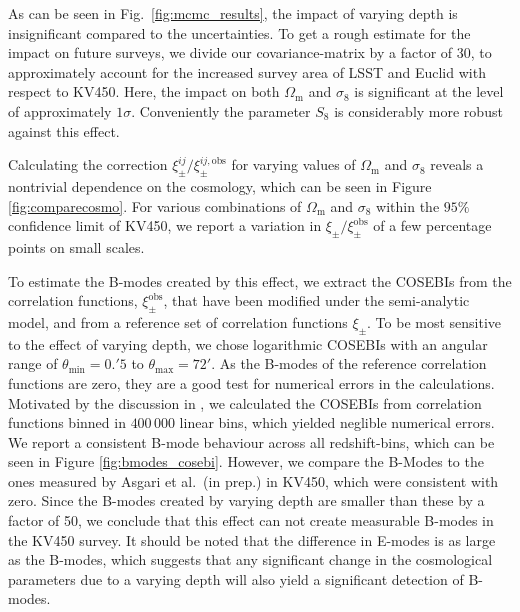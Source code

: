 \documentclass{aa}
\renewcommand{\rm}{\mathrm}
\begin{document}
As can be seen in Fig.~\ref{fig:mcmc_results}, the impact of varying depth is insignificant compared to the uncertainties. To get a rough estimate for the impact on future surveys, we divide our covariance-matrix by a factor of 30, to approximately account for the increased survey area of LSST and Euclid with respect to KV450. Here, the impact on both $\Omega_{\rm m}$ and $\sigma_8$ is significant at the level of approximately $1\sigma$. Conveniently the parameter $S_8$ is considerably more robust against this effect.

Calculating the correction $\xi_\pm^{ij}/\xi_\pm^{ij,\rm{obs}}$ for varying values of $\Omega_{\rm{m}}$ and $\sigma_8$ reveals a nontrivial dependence on the cosmology, which can be seen in Figure \ref{fig:comparecosmo}. For various combinations of $\Omega_{\rm{m}}$ and $\sigma_8$ within the $95\%$ confidence limit of KV450, we report a variation in $\xi_\pm/\xi_\pm^{\rm{obs}}$ of a few percentage points on small scales.

To estimate the B-modes created by this effect, we extract the COSEBIs
 from the correlation functions, $\xi_\pm^{\rm{obs}}$, that have been modified under the semi-analytic model, and from a reference set of correlation functions $\xi_\pm$. To be most sensitive to the effect of varying depth, we chose logarithmic COSEBIs with an angular range of $\theta_{\rm{min}}=0.\!'5$ to $\theta_{\rm{max}}=72'$. As the B-modes of the reference correlation functions are zero, they are a good test for numerical errors in the calculations. Motivated by the discussion in \citet{2017MNRAS.464.1676A}, we calculated the COSEBIs from correlation functions binned in $400\,000$ linear bins, which yielded neglible numerical errors. We report a consistent B-mode behaviour across all redshift-bins, which can be seen in Figure \ref{fig:bmodes_cosebi}. However, we compare the B-Modes to the ones measured by Asgari et al.~(in prep.) in KV450, which were consistent with zero. Since the B-modes created by varying depth are smaller than these by a factor of 50, we conclude that this effect can not create measurable B-modes in the KV450 survey. It should be noted that the difference in E-modes is as large as the B-modes, which suggests that any significant change in the cosmological parameters due to a varying depth will also yield a significant detection of B-modes.
\end{document}
